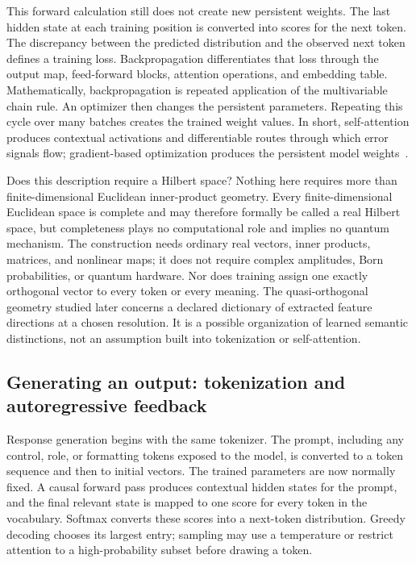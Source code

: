 \documentclass[
  aps,
  reprint,
  superscriptaddress,
  floatfix,
  nofootinbib,
  longbibliography
]{revtex4-2}
\begin{document}
This forward calculation still does not create new persistent weights.  The
last hidden state at each training position is converted into scores for the
next token.  The discrepancy between the predicted distribution and the
observed next token defines a training loss.  Backpropagation differentiates
that loss through the output map, feed-forward blocks, attention operations,
and embedding table.  Mathematically, backpropagation is repeated application
of the multivariable chain rule.  An optimizer then changes the persistent
parameters.
Repeating this cycle over many batches creates the trained weight values.  In
short, self-attention produces contextual activations and differentiable
routes through which error signals flow; gradient-based optimization produces
the persistent model weights~\cite{Goodfellow-et-al-2016-Book}.

Does this description require a Hilbert space?  Nothing here requires more
than finite-dimensional Euclidean inner-product geometry.  Every
finite-dimensional Euclidean space is complete and may therefore formally be
called a real Hilbert space, but completeness plays no computational role and
implies no quantum mechanism.  The
construction needs ordinary real vectors, inner products, matrices, and
nonlinear maps; it does not require complex amplitudes, Born probabilities, or
quantum hardware.  Nor does training assign one exactly orthogonal vector to
every token or every meaning.  The quasi-orthogonal geometry studied later
concerns a declared dictionary of extracted feature directions at a chosen
resolution.  It is a possible organization of learned semantic distinctions,
not an assumption built into tokenization or self-attention.

\subsection{Generating an output: tokenization and autoregressive feedback}
\label{sec:prose-generation}

Response generation begins with the same tokenizer.  The prompt, including
any control, role, or formatting tokens exposed to the model, is converted to
a token sequence and then to initial vectors.  The trained parameters are now
normally fixed.  A causal forward pass produces contextual hidden states for
the prompt, and the final relevant state is mapped to one score for every
token in the vocabulary.  Softmax converts these scores into a next-token
distribution.  Greedy decoding chooses its largest entry; sampling may use a
temperature or restrict attention to a high-probability subset before drawing
a token.
\end{document}
